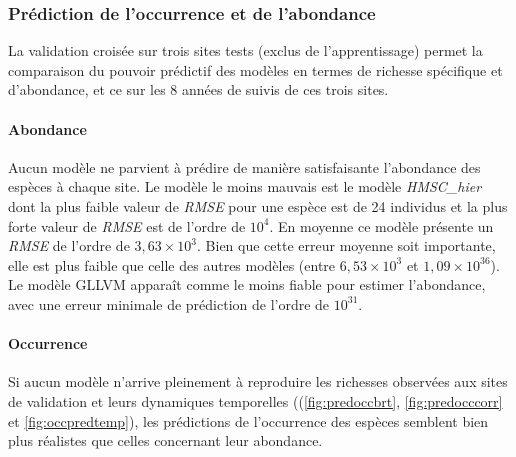 \documentclass[12pt,]{article}
\begin{document}
\hypertarget{pruxe9diction-de-loccurrence-et-de-labondance}{%
\subsubsection{Prédiction de l'occurrence et de
l'abondance}\label{pruxe9diction-de-loccurrence-et-de-labondance}}

La validation croisée sur trois sites tests (exclus de l'apprentissage)
permet la comparaison du pouvoir prédictif des modèles en termes de
richesse spécifique et d'abondance, et ce sur les 8 années de suivis de
ces trois sites.

\hypertarget{abondance}{%
\paragraph{Abondance}\label{abondance}}

Aucun modèle ne parvient à prédire de manière satisfaisante l'abondance
des espèces à chaque site. Le modèle le moins mauvais est le modèle
\emph{HMSC\_hier} dont la plus faible valeur de \emph{RMSE} pour une
espèce est de 24 individus et la plus forte valeur de \emph{RMSE} est de
l'ordre de \(10^4\). En moyenne ce modèle présente un \emph{RMSE} de
l'ordre de \(3,63\times 10^3\). Bien que cette erreur moyenne soit
importante, elle est plus faible que celle des autres modèles (entre
\(6,53\times 10^3\) et \(1,09\times 10^{36}\)). Le modèle GLLVM apparaît
comme le moins fiable pour estimer l'abondance, avec une erreur minimale
de prédiction de l'ordre de \(10^31\).

\hypertarget{occurrence}{%
\paragraph{Occurrence}\label{occurrence}}

Si aucun modèle n'arrive pleinement à reproduire les richesses observées
aux sites de validation et leurs dynamiques temporelles
((\cref{fig:predoccbrt}, \cref{fig:predocccorr} et
\cref{fig:occpredtemp}), les prédictions de l'occurrence des espèces
semblent bien plus réalistes que celles concernant leur abondance.
\end{document}
